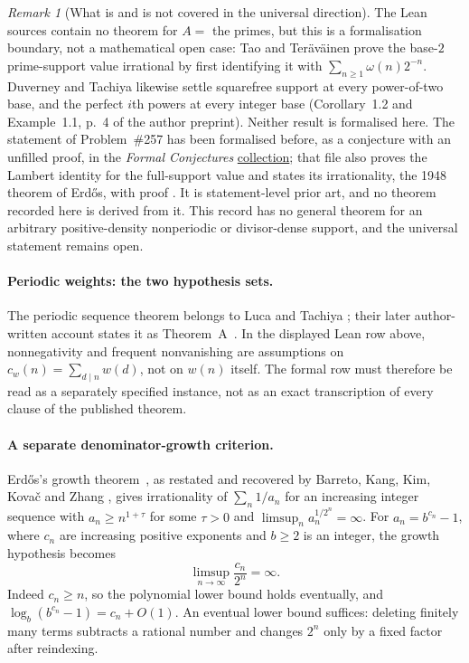 \documentclass[11pt]{article}
\theoremstyle{plain}
\theoremstyle{definition}
\theoremstyle{remark}
\newtheorem{rem}[thm]{Remark}
\let\origtexttt\texttt
\renewcommand{\texttt}[1]{\origtexttt{\seqsplit{#1}}}%
\begin{document}
\begin{rem}[What is and is not covered in the universal direction]
The Lean sources contain no theorem for $A=$ the primes, but this is a
formalisation boundary, not a mathematical open case: Tao and
Ter\"av\"ainen prove the base-$2$ prime-support value irrational by first
identifying it with $\sum_{n\ge1}\omega(n)2^{-n}$.  Duverney and Tachiya
likewise settle squarefree support at every power-of-two base, and the
perfect $i$th powers at every integer base (Corollary~1.2 and Example~1.1,
p.~4 of the author preprint).  Neither
result is formalised here.  The statement of Problem~\#257 has been formalised
before, as a conjecture with an unfilled proof, in the \emph{Formal
Conjectures}
\href{https://github.com/google-deepmind/formal-conjectures/blob/f776d2f2039351b00737ffcafb9d7d7666e1d9af/FormalConjectures/ErdosProblems/257.lean}{collection};
that file also proves the Lambert identity for the full-support value and
states its irrationality, the 1948 theorem of Erd\H{o}s, with proof
\texttt{sorry}.  It is statement-level prior art, and no theorem recorded here
is derived from it.  This record has no general theorem for an
arbitrary positive-density nonperiodic or divisor-dense support, and the
universal statement remains open.
\end{rem}

\paragraph{Periodic weights: the two hypothesis sets.}
The periodic sequence theorem belongs to Luca and Tachiya
\cite{lucatachiya2014periodic}; their later author-written account states
it as Theorem~A~\cite[p.~139]{lucatachiya2017}.  In the displayed Lean
row above, nonnegativity and frequent nonvanishing are assumptions on
$c_w(n)=\sum_{d\mid n}w(d)$, not on $w(n)$ itself.  The formal row must
therefore be read as a separately specified instance, not as an exact
transcription of every clause of the published theorem.

\paragraph{A separate denominator-growth criterion.}
Erd\H{o}s's growth theorem~\cite{erdos1975}, as restated and recovered
by Barreto, Kang, Kim, Kova\v{c} and Zhang
\cite[Remark~4(4), p.~5]{bkkkz2026}, gives irrationality of
$\sum_n1/a_n$ for an increasing integer sequence with
$a_n\ge n^{1+\tau}$ for some $\tau>0$ and
$\limsup_n a_n^{1/2^n}=\infty$.  For $a_n=b^{c_n}-1$, where
$c_n$ are increasing positive exponents and $b\ge2$ is an integer,
the growth hypothesis becomes
\[
 \limsup_{n\to\infty}\frac{c_n}{2^n}=\infty.
\]
Indeed $c_n\ge n$, so the polynomial lower bound holds eventually,
and $\log_b(b^{c_n}-1)=c_n+O(1)$.  An eventual lower bound suffices:
deleting finitely many terms subtracts a rational number and changes
$2^n$ only by a fixed factor after reindexing.
\end{document}
